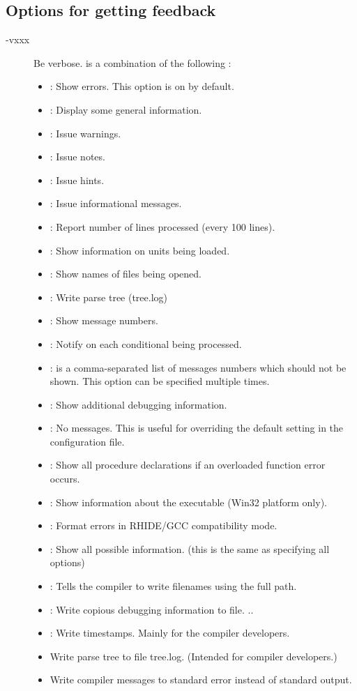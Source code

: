 %
%
\subsection{Options for getting feedback}
\label{se:feedbackoptions}
\begin{description}
\item[-vxxx] Be verbose.  is a combination of the following :
\begin{itemize}
\item {} : Show errors. This option is on by default.
\item {} : Display some general information.
\item {} : Issue warnings.
\item {} : Issue notes.
\item {} : Issue hints.
\item {} : Issue informational messages.
\item {} : Report number of lines processed (every 100 lines).
\item {} : Show information on units being loaded.
\item {} : Show names of files being opened.
\item {} : Write parse tree (tree.log)
\item {} : Show message numbers.
\item {} : Notify on each conditional being processed.
\item {} :  is a comma-separated list of messages numbers which should not be shown.
This option can be specified multiple times.
\item {} : Show additional debugging information.
\item {} : No messages. This is useful for overriding the default
          setting in the configuration file.
\item {} : Show all procedure declarations if an overloaded function error occurs.
\item {} : Show information about the executable (Win32 platform only).
\item {} : Format errors in RHIDE/GCC compatibility mode.
\item {} : Show all possible information. (this is the same as specifying all options)
\item {} : Tells the compiler to write filenames using the full path.
\item {} : Write copious debugging information to file.
..
\item {} : Write timestamps. Mainly for the compiler developers.
\item {} Write parse tree to file tree.log. (Intended for compiler  developers.)
\item {} Write compiler messages to standard error instead of standard output.
\end{itemize}

\end{description}

